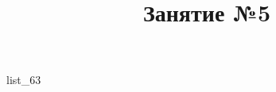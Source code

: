 \documentclass[12pt, a4paper]{article}
\begin{document}
	\title{Занятие №5}
	{list_63}
\end{document}
